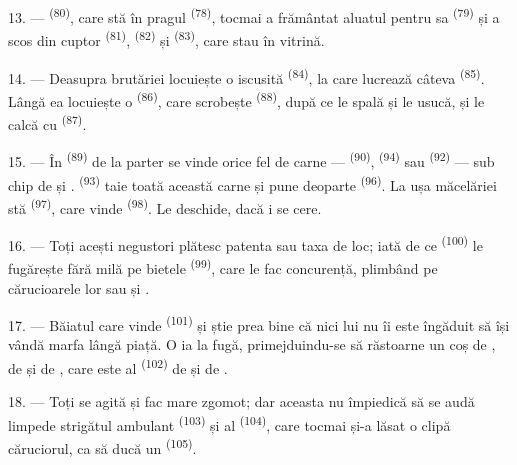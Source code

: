 13. ---  \textsuperscript{(80)}, care stă în pragul
 \textsuperscript{(78)}, tocmai a frământat aluatul pentru
 sa \textsuperscript{(79)} și a scos din cuptor 
\textsuperscript{(81)},  \textsuperscript{(82)} și
 \textsuperscript{(83)}, care stau în vitrină.

14. --- Deasupra brutăriei locuiește o  iscusită
\textsuperscript{(84)}, la care lucrează câteva 
\textsuperscript{(85)}. Lângă ea locuiește o 
\textsuperscript{(86)}, care scrobește  \textsuperscript{(88)}, după
ce le spală și le usucă, și le calcă cu 
\textsuperscript{(87)}.

\VUsaut{4.0mm}
\VUsaut{3.0mm}

15. --- În  \textsuperscript{(89)} de la parter se vinde orice fel
de carne ---  \textsuperscript{(90)}, 
\textsuperscript{(94)} sau  \textsuperscript{(92)} --- sub
chip de  și .
 \textsuperscript{(93)} taie toată această carne și
pune deoparte  \textsuperscript{(96)}. La ușa măcelăriei
stă  \textsuperscript{(97)}, care vinde
 \textsuperscript{(98)}. Le deschide, dacă i se cere.

16. --- Toți acești negustori plătesc patenta sau taxa de loc; iată de ce
 \textsuperscript{(100)} le fugărește fără milă pe
bietele  \textsuperscript{(99)}, care le fac
concurență, plimbând pe cărucioarele lor  sau
 și
.

\VUsaut{4.0mm}
\VUsaut{3.0mm}

17. --- Băiatul care vinde  \textsuperscript{(101)} și
 știe prea bine că nici lui nu îi este îngăduit să își vândă marfa
lângă piață. O ia la fugă, primejduindu-se să răstoarne un coș de ,
de  și de , care este al 
\textsuperscript{(102)} de  și de .

18. --- Toți se agită și fac mare zgomot; dar aceasta nu împiedică să se audă
limpede strigătul  ambulant \textsuperscript{(103)} și al
 \textsuperscript{(104)}, care tocmai și-a lăsat o clipă
căruciorul, ca să ducă un  \textsuperscript{(105)}.
\VUsaut{6.0mm}
\VUfilet{22mm}
